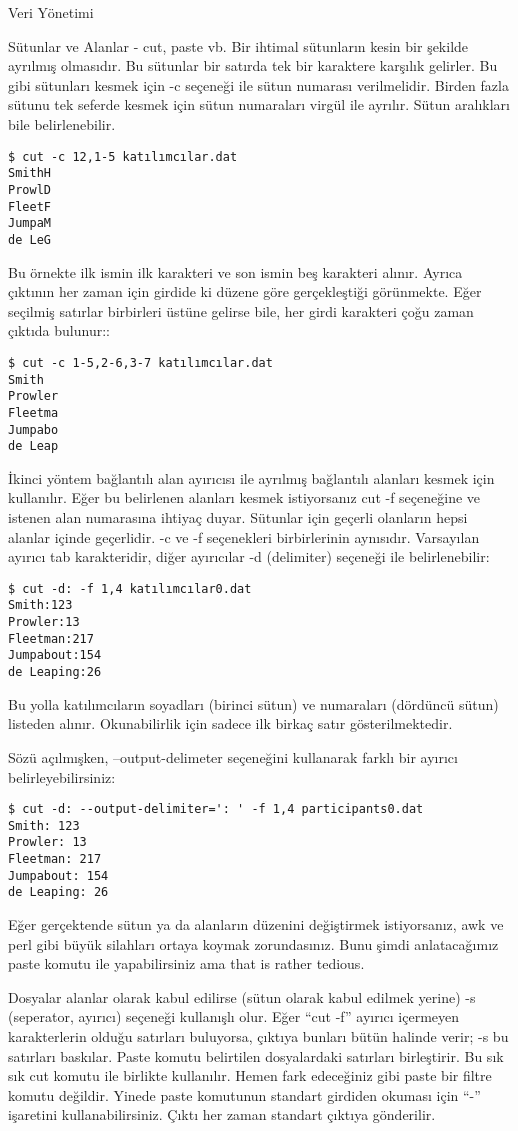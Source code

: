 \begin{section}{Veri Yönetimi}
\begin{subsection}{Sütunlar ve Alanlar - cut, paste vb.}
Bir ihtimal sütunların kesin bir şekilde ayrılmış olmasıdır. Bu sütunlar bir satırda tek bir karaktere karşılık gelirler. Bu gibi sütunları kesmek için -c seçeneği ile sütun numarası verilmelidir. Birden fazla sütunu tek seferde kesmek için sütun numaraları virgül ile ayrılır. Sütun aralıkları bile belirlenebilir.
\begin{verbatim}
$ cut -c 12,1-5 katılımcılar.dat 
SmithH 
ProwlD 
FleetF 
JumpaM 
de LeG 
\end{verbatim}

Bu örnekte ilk ismin ilk karakteri ve son ismin beş karakteri alınır. Ayrıca çıktının her zaman için girdide ki düzene göre gerçekleştiği görünmekte. Eğer seçilmiş satırlar birbirleri üstüne gelirse bile, her girdi karakteri çoğu zaman çıktıda bulunur:: 
\begin{verbatim}
$ cut -c 1-5,2-6,3-7 katılımcılar.dat 
Smith 
Prowler 
Fleetma 
Jumpabo 
de Leap
\end{verbatim}

İkinci yöntem bağlantılı alan ayırıcısı ile ayrılmış bağlantılı alanları kesmek için kullanılır. Eğer bu belirlenen alanları kesmek istiyorsanız cut -f seçeneğine ve istenen alan numarasına ihtiyaç duyar. Sütunlar için geçerli olanların hepsi alanlar içinde geçerlidir. -c ve -f  seçenekleri birbirlerinin aynısıdır.
Varsayılan ayırıcı tab karakteridir, diğer ayırıcılar -d (delimiter) seçeneği ile belirlenebilir:
\begin{verbatim}
$ cut -d: -f 1,4 katılımcılar0.dat 
Smith:123 
Prowler:13 
Fleetman:217 
Jumpabout:154 
de Leaping:26
\end{verbatim}

Bu yolla katılımcıların soyadları (birinci sütun) ve numaraları (dördüncü sütun) listeden alınır. Okunabilirlik için sadece ilk birkaç satır gösterilmektedir.

Sözü açılmışken, --output-delimeter seçeneğini kullanarak farklı bir ayırıcı belirleyebilirsiniz:
\begin{verbatim}
$ cut -d: --output-delimiter=': ' -f 1,4 participants0.dat
Smith: 123
Prowler: 13
Fleetman: 217
Jumpabout: 154
de Leaping: 26
\end{verbatim}

Eğer gerçektende sütun ya da alanların düzenini değiştirmek istiyorsanız, awk ve perl gibi büyük silahları ortaya koymak zorundasınız. Bunu şimdi anlatacağımız paste komutu ile yapabilirsiniz ama that is rather tedious. 

Dosyalar alanlar olarak kabul edilirse (sütun olarak kabul edilmek yerine) -s (seperator, ayırıcı) seçeneği kullanışlı olur.  Eğer “cut -f” ayırıcı içermeyen karakterlerin olduğu satırları buluyorsa, çıktıya bunları bütün halinde verir; -s bu satırları baskılar. Paste komutu belirtilen dosyalardaki satırları birleştirir. Bu sık sık cut komutu ile birlikte kullanılır. Hemen fark edeceğiniz gibi paste bir filtre komutu değildir. Yinede paste komutunun standart girdiden okuması için “-” işaretini kullanabilirsiniz. Çıktı her zaman standart çıktıya gönderilir. 


\end{subsection}
\end{section}
